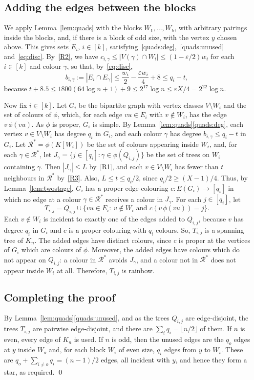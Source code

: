 \subsection{Adding the edges between the blocks}\label{sec:outside}
We apply Lemma~\ref{lem:quads} with the blocks $W_1,\ldots,W_k$, with arbitrary pairings inside the blocks, and, if there is a block of odd size, with the vertex $y$ chosen above. This gives sets $E_i$, $i\in [k]$, satisfying~\ref{quads:deg},~\ref{quads:unused} and~\eqref{eq:disc}.
By~\ref{R2}, we have $c_{i,\gamma}\le|V(\gamma)\cap W_i|\le(1-\varepsilon/2)w_i$ for each $i\in[k]$ and colour $\gamma$, so that, by~\eqref{eq:disc},
\[b_{i,\gamma}:=|E_i\cap E_\gamma|\le\frac{w_i}2-\frac{\varepsilon w_i}4+8\le q_i-t,\]
because $t+8.5\le1800(64\log n+1)+9\le2^{17}\log n\le\varepsilon X/4=2^{22}\log n$.

Now fix $i\in [k]$. Let $G_i$ be the bipartite graph with vertex classes $V\setminus W_i$ and the set of colours of $\phi$, which, for each edge $vu\in E_i$ with $v\notin W_i$, has the edge $v\,\phi(vu)$. As $\phi$ is proper, $G_i$ is simple.
By Lemma~\ref{lem:quads}\ref{quads:deg}, each vertex $v\in V\setminus W_i$ has degree $q_i$ in $G_i$, and each colour $\gamma$ has degree $b_{i,\gamma}\le q_i-t$ in $G_i$.
Let $\mathcal{R}^*=\phi(K[W_i])$ be the set of colours appearing inside $W_i$, and, for each $\gamma\in \mathcal{R}^*$, let $J_\gamma=\{j\in [q_i]:\gamma\in\phi(Q_{i,j})\}$ be the set of trees on $W_i$ containing $\gamma$. Then $|J_\gamma|\le L$ by~\ref{R1}, and each $v\in V\setminus W_i$ has fewer than $t$ neighbours in $\mathcal{R}^*$ by~\ref{R3}. Also, $L\le t\le q_i/2$, since $q_i/2\ge (X-1)/4$.
Thus, by Lemma~\ref{lem:twostage}, $G_i$ has a proper edge-colouring $c:E(G_i)\to[q_i]$ in which no edge at a colour $\gamma\in\mathcal{R}^*$ receives a colour in $J_\gamma$.
For each $j\in [q_i]$, let
\[T_{i,j}=Q_{i,j}\cup\{vu\in E_i:\ v\notin W_i\text{ and }c(v\,\phi(vu))=j\}.\]
Each $v\notin W_i$ is incident to exactly one of the edges added to $Q_{i,j}$, because $v$ has degree $q_i$ in $G_i$ and $c$ is a proper colouring with $q_i$ colours. So, $T_{i,j}$ is a spanning tree of $K_n$.
The added edges have distinct colours, since $c$ is proper at the vertices of $G_i$ which are colours of $\phi$.
Moreover, the added edges have colours which do not appear on $Q_{i,j}$: a colour in $\mathcal R^*$ avoids $J_\gamma$, and a colour not in $\mathcal{R}^*$ does not appear inside $W_i$ at all. Therefore, $T_{i,j}$ is rainbow.

\subsection{Completing the proof}\label{sec:counting}
By Lemma~\ref{lem:quads}\ref{quads:unused}, and as the trees $Q_{i,j}$ are edge-disjoint, the trees $T_{i,j}$ are pairwise edge-disjoint, and there are $\sum_iq_i=\lfloor n/2\rfloor$ of them.
If $n$ is even, every edge of $K_n$ is used. If $n$ is odd, then the unused edges are the $q_o$ edges at $y$ inside $W_o$ and, for each block $W_i$ of even size, $q_i$ edges from $y$ to $W_i$. These are $q_o+\sum_{i\ne o}q_i=(n-1)/2$ edges, all incident with $y$, and hence they form a star, as required. \qed

